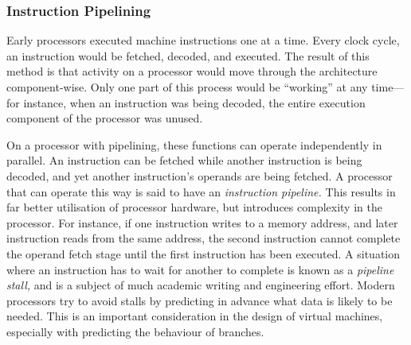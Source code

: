 			\subsubsection{Instruction Pipelining}
			Early processors executed machine instructions one at a time. Every clock cycle, an instruction would be fetched, decoded, and executed. The result of this method is that activity on a processor would move through the architecture component-wise. Only one part of this process would be ``working'' at any time---for instance, when an instruction was being decoded, the entire execution component of the processor was unused.
			
			On a processor with pipelining, these functions can operate independently in parallel. An instruction can be fetched while another instruction is being decoded, and yet another instruction's operands are being fetched. A processor that can operate this way is said to have an \emph{instruction pipeline.} This results in far better utilisation of processor hardware, but introduces complexity in the processor. For instance, if one instruction writes to a memory address, and later instruction reads from the same address, the second instruction cannot complete the operand fetch stage until the first instruction has been executed. A situation where an instruction has to wait for another to complete is known as a \emph{pipeline stall,} and is a subject of much academic writing and engineering effort. Modern processors try to avoid stalls by predicting in advance what data is likely to be needed. This is an important consideration in the design of virtual machines, especially with predicting the behaviour of branches.
			
